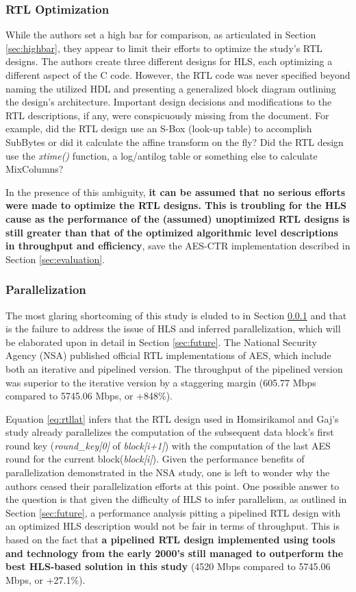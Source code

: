 \documentclass[12pt,journal,compsoc,onecolumn]{IEEEtran}
\begin{document}
\subsubsection{RTL Optimization}\label{sec:rtlop}
While the authors set a high bar for comparison, as articulated in Section \ref{sec:highbar}, they appear to limit their efforts to optimize the study's RTL designs. The authors create three different designs for HLS, each optimizing a different aspect of the C code. However, the RTL code was never specified beyond naming the utilized HDL and presenting a generalized block diagram outlining the design's architecture. Important design decisions and modifications to the RTL descriptions, if any, were conspicuously missing from the document. For example, did the RTL design use an S-Box (look-up table) to accomplish SubBytes or did it calculate the affine transform on the fly? Did the RTL design use the \emph{xtime()} function, a log/antilog table or something else to calculate MixColumns? 

In the presence of this ambiguity, \textbf{it can be assumed that no serious efforts were made to optimize the RTL designs. This is troubling for the HLS cause as the performance of the (assumed) unoptimized RTL designs is still greater than that of the optimized algorithmic level descriptions in throughput and efficiency}, save the AES-CTR implementation described in Section \ref{sec:evaluation}.

\subsubsection{Parallelization}\label{sec:parallel}
The most glaring shortcoming of this study is eluded to in Section \ref{sec:rtlop} and that is the failure to address the issue of HLS and inferred parallelization, which will be elaborated upon in detail in Section \ref{sec:future}. The National Security Agency (NSA) published official RTL implementations of AES, which include both an iterative and pipelined version\cite{nsa}. The throughput of the pipelined version was superior to the iterative version by a staggering margin (605.77 Mbps compared to 5745.06 Mbps, or +848\%)\cite{nsaweeks}.

Equation \ref{eq:rtllat} infers that the RTL design used in Homsirikamol and Gaj's study already parallelizes the computation of the subsequent data block's first round key (\emph{round\_key[0]} of \emph{block[i+1]}) with the computation of the last AES round for the current block(\emph{block[i]}). Given the performance benefits of parallelization demonstrated in the NSA study, one is left to wonder why the authors ceased their parallelization efforts at this point. One possible answer to the question is that given the difficulty of HLS to infer parallelism, as outlined in Section \ref{sec:future}, a performance analysis pitting a pipelined RTL design with an optimized HLS description would not be fair in terms of throughput. This is based on the fact that \textbf{a pipelined RTL design implemented using tools and technology from the early 2000's still managed to outperform the best HLS-based solution in this study} (4520 Mbps compared to 5745.06 Mbps\cite{nsaweeks}, or +27.1\%). 
\end{document}
